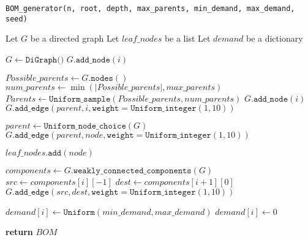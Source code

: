 \documentclass{article}
\begin{document}
	
	\setcounter{algorithm}{1}  %
	
	\begin{algorithm}
		\caption{\texttt{BOM\_generator(n, root, depth, max\_parents, min\_demand, max\_demand, seed)}}
		
		
		\begin{algorithmic}[1]
			
			\State Let $G$ be a directed graph
			\State Let $leaf\_nodes$ be a list
			\State Let $demand$ be a dictionary
			
			\Statex
			\State $G \gets \texttt{DiGraph()}$
			\State $G.\texttt{add\_node}(i)$
			\EndFor
			
			\State $Possible\_parents \gets G.\texttt{nodes}()$
			\State $num\_parents \gets \min(|Possible\_parents|, max\_parents)$
			\State $Parents \gets \texttt{Uniform\_sample}(Possible\_parents, num\_parents)$
			\State $G.\texttt{add\_node}(i)$
			\State $G.\texttt{add\_edge}(parent, i, \texttt{weight} = \texttt{Uniform\_integer}(1, 10))$
			\EndFor
			\EndFor
			
			 
			\State $parent \gets \texttt{Uniform\_node\_choice}(G)$
			\State $G.\texttt{add\_edge}(parent, node, \texttt{weight} = \texttt{Uniform\_integer}(1, 10))$
			\EndIf
			\EndIf
			\EndFor
			
			\State $leaf\_nodes.\texttt{add}(node)$
			\EndIf
			\EndFor
			
			\State $components \gets G.\texttt{weakly\_connected\_components}(G)$
			\State $src \gets components[i][-1]$
			\State $dest \gets components[i+1][0]$
			\State $G.\texttt{add\_edge}(src, dest, \texttt{weight} = \texttt{Uniform\_integer}(1, 10))$
			\EndFor
			\EndIf
			\EndIf
			
			\State $demand[i] \gets \texttt{Uniform}(min\_demand, max\_demand)$
			\Else
			\State $demand[i] \gets 0$
			\EndIf
			\EndFor
			
			\Statex
			\State \textbf{return} $BOM$
			
		\end{algorithmic}
	\end{algorithm}
	
\end{document}
